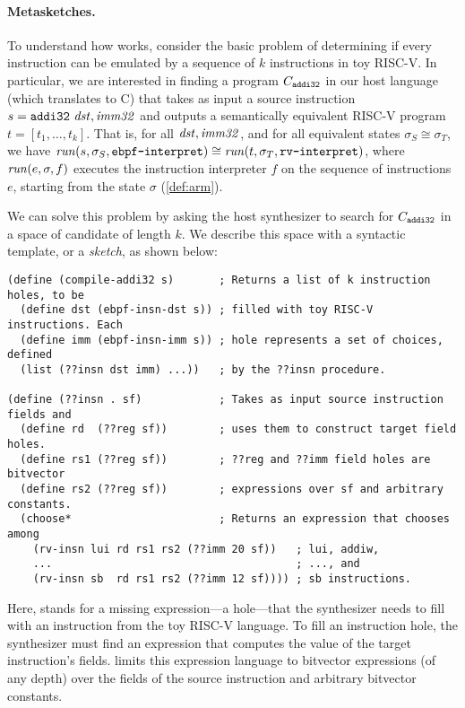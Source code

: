 \paragraph{Metasketches.} 

To understand how \jitsynth works, consider the basic problem of determining if
every  instruction can be emulated by a sequence of $k$ instructions
in toy RISC-V\@. In particular, we are interested in finding a program
$C_{\texttt{addi32}}$ in our host language (which \jitsynth translates to C) that
takes as input a source instruction $s = \texttt{addi32}\ \mathit{dst}, \mathit{imm32}$ and
outputs a semantically equivalent RISC-V program $t = [t_1,\ldots,t_k]$. That
is, for all $\mathit{dst}, \mathit{imm32}$, and for all equivalent states $\sigma_S \cong
\sigma_T$, we have $\mathit{run}(s, \sigma_S,
\texttt{ebpf-interpret})\cong\mathit{run}(t, \sigma_T, \texttt{rv-interpret})$, where
$\mathit{run}(e, \sigma, f)$ executes the instruction interpreter $f$ on the
sequence of instructions $e$, starting from the state $\sigma$
(\autoref{def:arm}).\tighten

We can solve this problem by asking the host synthesizer to search for
$C_{\texttt{addi32}}$ in a space of candidate \minicompilers of length $k$. We
describe this space with a syntactic template, or a \emph{sketch}, as shown below:

\begin{lstlisting}[language=rosette,xleftmargin=0em,mathescape=true]
(define (compile-addi32 s)       ; Returns a list of k instruction holes, to be 
  (define dst (ebpf-insn-dst s)) ; filled with toy RISC-V instructions. Each    
  (define imm (ebpf-insn-imm s)) ; hole represents a set of choices, defined 
  (list (??insn dst imm) ...))   ; by the ??insn procedure. 

(define (??insn . sf)            ; Takes as input source instruction fields and
  (define rd  (??reg sf))        ; uses them to construct target field holes. 
  (define rs1 (??reg sf))        ; ??reg and ??imm field holes are bitvector 
  (define rs2 (??reg sf))        ; expressions over sf and arbitrary constants.
  (choose*                       ; Returns an expression that chooses among  
    (rv-insn lui rd rs1 rs2 (??imm 20 sf))   ; lui, addiw,
    ...                                      ; ..., and
    (rv-insn sb  rd rs1 rs2 (??imm 12 sf)))) ; sb instructions.
\end{lstlisting}

Here,  stands for a missing expression---a hole---that the
synthesizer needs to fill with an instruction from the toy RISC-V language. To
fill an instruction hole, the synthesizer must find an expression that computes
the value of the target instruction's fields. \jitsynth limits this expression
language to bitvector expressions (of any depth) over the fields of the source
instruction and arbitrary bitvector constants.\tighten


